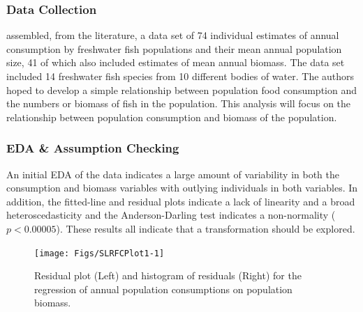 \documentclass[10pt,openany]{book}\usepackage[]{graphicx}\usepackage[]{color}
\newenvironment{knitrout}{}{} %
\begin{document}
\subsubsection*{Data Collection}
\cite{Liaoetal2005} assembled, from the literature, a data set of 74 individual estimates of annual consumption by freshwater fish populations and their mean annual population size, 41 of which also included estimates of mean annual biomass.  The data set included 14 freshwater fish species from 10 different bodies of water.  The authors hoped to develop a simple relationship between population food consumption and the numbers or biomass of fish in the population.  This analysis will focus on the relationship between population consumption and biomass of the population.

\subsubsection*{EDA \& Assumption Checking}


An initial EDA of the data indicates a large amount of variability in both the consumption and biomass variables with outlying individuals in both variables.  In addition, the fitted-line and residual plots indicate a lack of linearity and a broad heteroscedasticity and the Anderson-Darling test indicates a non-normality ($p<0.00005$).  These results all indicate that a transformation should be explored.

\begin{knitrout}
\color{fgcolor}\begin{figure}[h]

{\centering \texttt{[image: Figs/SLRFCPlot1-1]} 

}

\caption[Residual plot (Left) and histogram of residuals (Right) for the regression of annual population consumptions on population biomass]{Residual plot (Left) and histogram of residuals (Right) for the regression of annual population consumptions on population biomass.}\label{fig:SLRFCPlot1}
\end{figure}


\end{knitrout}
\end{document}
